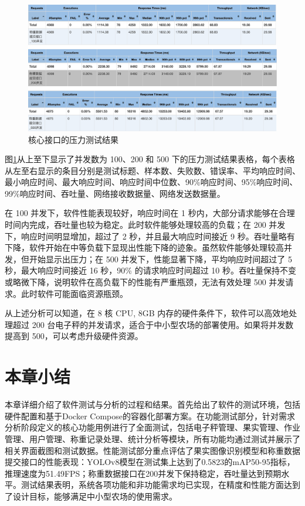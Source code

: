 \begin{figure}[H]
    \centering
    \includegraphics[width=0.95\linewidth]{../source/aws-test/jmeter-test-result.png}
    \caption{核心接口的压力测试结果}
    \label{fig:jmeter-test-result}
\end{figure}

图\ref{fig:jmeter-test-result}从上至下显示了并发数为 100、200 和 500 下的压力测试结果表格，每个表格从左至右显示的条目分别是测试标题、样本数、失败数、错误率、平均响应时间、最小响应时间、最大响应时间、响应时间中位数、90\%响应时间、95\%响应时间、99\%响应时间、吞吐量、网络接收数据量、网络发送数据量。

在 100 并发下，软件性能表现较好，响应时间在 1 秒内，大部分请求能够在合理时间内完成，吞吐量也较为稳定。此时软件能够处理较高的负载；在 200 并发下，响应时间明显增加，超过了 2 秒，并且最大响应时间接近 9 秒。吞吐量略有下降，软件开始在中等负载下显现出性能下降的迹象。虽然软件能够处理较高并发，但开始显示出压力；在 500 并发下，性能显著下降，平均响应时间超过了 5 秒，最大响应时间接近 16 秒，90\% 的请求响应时间超过 10 秒。吞吐量保持不变或略微下降，说明软件在高负载下的性能有严重瓶颈，无法有效处理 500 并发请求。此时软件可能面临资源瓶颈。

从上述分析可以知道，在 8 核 CPU, 8GB 内存的硬件条件下，软件可以高效地处理超过 200 台电子秤的并发请求，适合于中小型农场的部署使用。如果将并发数提高到 500，可以考虑升级硬件资源。

\section{本章小结}

本章详细介绍了软件测试与分析的过程和结果。首先给出了软件的测试环境，包括硬件配置和基于Docker Compose的容器化部署方案。在功能测试部分，针对需求分析阶段定义的核心功能用例进行了全面测试，包括电子秤管理、果实管理、作业管理、用户管理、称重记录处理、统计分析等模块，所有功能均通过测试并展示了相关界面截图和测试数据。性能测试部分重点评估了果实图像识别模型和称重数据提交接口的性能表现：YOLOv8模型在测试集上达到了0.5823的mAP50-95指标，推理速度为51.49FPS；称重数据接口在200并发下保持稳定，吞吐量达到预期水平。测试结果表明，系统各项功能和非功能需求均已实现，在精度和性能方面达到了设计目标，能够满足中小型农场的使用需求。
